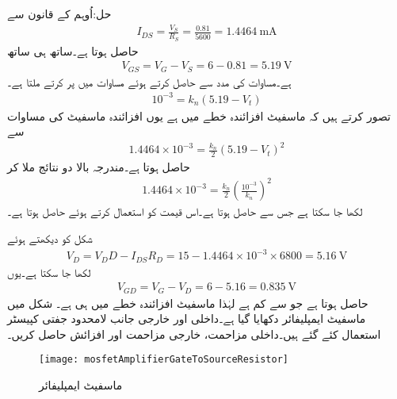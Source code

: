 حل:اُوہم کے قانون سے
\begin{align*}
I_{DS}=\frac{V_S}{R_S}=\frac{0.81}{5600}=\SI{1.4464}{\milli \ampere}
\end{align*}
حاصل ہوتا ہے۔ساتھ ہی ساتھ
\begin{align*}
V_{GS}=V_G-V_S=6-0.81=\SI{5.19}{\volt}
\end{align*}
ہے۔مساوات  کی مدد سے  حاصل کرتے ہوئے مساوات  میں پر کرتے ملتا ہے۔
\begin{align*}
10^{-3}=k_n \left(5.19-V_t \right)
\end{align*}
تصور کرتے ہیں کہ ماسفیٹ افزائندہ خطے میں ہے یوں افزائندہ ماسفیٹ کی مساوات سے
\begin{align*}
1.4464 \times 10^{-3}=\frac{k_n}{2} \left(5.19-V_t \right)^2
\end{align*}
حاصل ہوتا ہے۔مندرجہ بالا دو نتائج ملا کر
\begin{align*}
1.4464 \times 10^{-3}=\frac{k_n}{2} \left( \frac{10^{-3}}{k_n}\right)^2
\end{align*}
لکھا جا سکتا ہے جس سے  حاصل ہوتا ہے۔اس قیمت کو استعمال کرتے ہوئے  حاصل ہوتا ہے۔

شکل کو دیکھتے ہوئے
\begin{align*}
V_D=V_DD-I_{DS} R_D=15-1.4464 \times 10^{-3} \times 6800=\SI{5.16}{\volt}
\end{align*}
لکھا جا سکتا ہے۔یوں
\begin{align*}
V_{GD}=V_G-V_D=6-5.16=\SI{0.835}{\volt}
\end{align*}
حاصل ہوتا ہے جو  سے کم ہے لہٰذا ماسفیٹ افزائندہ خطے میں ہی ہے۔
شکل  میں ماسفیٹ ایمپلیفائر دکھایا گیا ہے۔داخلی اور خارجی جانب لامحدود جفتی کپیسٹر استعمال کئے گئے ہیں۔داخلی مزاحمت، خارجی مزاحمت اور افزائش  حاصل کریں۔

\begin{figure}
\centering
\texttt{[image: mosfetAmplifierGateToSourceResistor]}
\caption{ماسفیٹ ایمپلیفائر}
\label{شکل_ماسفیٹ_ایمپلیفائر_مثال}
\end{figure}

